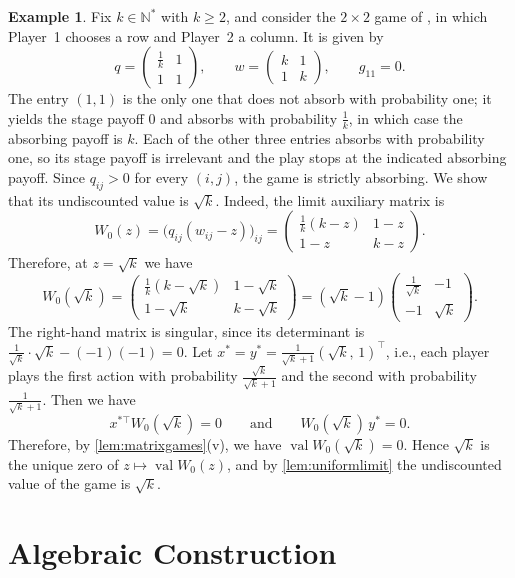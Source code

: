 \documentclass[11pt, a4paper]{article}
\theoremstyle{plain}
\theoremstyle{definition}
\newtheorem{example}{Example}
\newcommand{\N}{\mathbb{N}}
\DeclareMathOperator{\val}{val}
\begin{document}
\begin{example}\label{ex:OVtheorem3}
Fix $k\in\N^*$ with $k\geq2$, and consider the $2\times2$ game of \citet[Theorem~3]{OV23}, in which Player~1 chooses a row and Player~2 a column.
It is given by
\[
q=\begin{pmatrix}\tfrac1k&1\\[2pt] 1&1\end{pmatrix},
\qquad
w=\begin{pmatrix}k&1\\[2pt] 1&k\end{pmatrix},
\qquad
g_{11}=0 .
\]
The entry $(1,1)$ is the only one that does not absorb with probability one; it yields the stage payoff $0$ and absorbs with probability $\tfrac1k$, in which case the absorbing payoff is $k$.
Each of the other three entries absorbs with probability one, so its stage payoff is irrelevant and the play stops at the indicated absorbing payoff.
Since $q_{ij}>0$ for every $(i,j)$, the game is strictly absorbing.
We show that its undiscounted value is $\sqrt k$.
Indeed, the limit auxiliary matrix is
\[
W_0(z)=\bigl(q_{ij}(w_{ij}-z)\bigr)_{ij}
=\begin{pmatrix}\tfrac1k(k-z)&1-z\\[2pt] 1-z&k-z\end{pmatrix}.
\]
Therefore, at $z=\sqrt k$ we have
\[
W_0(\sqrt k)
=\begin{pmatrix}\tfrac1k(k-\sqrt k)&1-\sqrt k\\[2pt] 1-\sqrt k&k-\sqrt k\end{pmatrix}
=(\sqrt k-1)\begin{pmatrix}\tfrac{1}{\sqrt k}&-1\\[2pt] -1&\sqrt k\end{pmatrix} .
\]
The right-hand matrix is singular, since its determinant is $\tfrac{1}{\sqrt k}\cdot\sqrt k-(-1)(-1)=0$.
Let $x^*=y^*=\frac{1}{\sqrt k+1}(\sqrt k,\,1)^{\top}$, i.e., each player plays the first action with probability $\frac{\sqrt k}{\sqrt k+1}$ and the second with probability $\frac{1}{\sqrt k+1}$.
Then we have
\[
x^{*\top}W_0(\sqrt k)=0
\qquad\text{and}\qquad
W_0(\sqrt k)\,y^*=0 .
\]
Therefore, by \cref{lem:matrixgames}(v), we have $\val W_0(\sqrt k)=0$.
Hence $\sqrt k$ is the unique zero of $z\mapsto\val W_0(z)$, and by \cref{lem:uniformlimit} the undiscounted value of the game is $\sqrt k$.
\end{example}

\section{Algebraic Construction}\label{sec:algebra}
\end{document}
